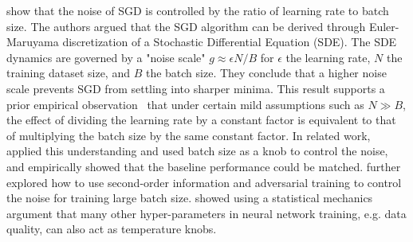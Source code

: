 \citep{jastrzkebski2017three,smith2018bayesian,devarakonda2017adabatch} show that the noise of SGD is controlled by the ratio of learning rate to batch size. The authors argued that
the SGD algorithm can be derived through Euler-Maruyama discretization of a Stochastic Differential Equation (SDE).
The SDE dynamics are  governed by a "noise scale" $g \approx \epsilon N/B$ for $\epsilon$ the learning rate, $N$ 
the training dataset size, and $B$ the batch size. They conclude that a higher noise scale 
prevents SGD from settling into sharper minima. This result supports a prior empirical 
observation~\citep{krizhevsky2014one} that under certain mild assumptions such as $N \gg B$,
the effect of dividing the learning rate by a constant factor is equivalent to that of 
multiplying the batch size by the same constant factor.
In related work, \citep{smith2017don} applied this understanding and used batch size
as a knob to control the noise, and empirically showed that the baseline performance could be matched. \cite{yao2018large} further explored how to use second-order information and adversarial training to control the noise for training large batch size.
\cite{martin2017rethinking,martin2018implicit} showed using a statistical mechanics argument that many other hyper-parameters in neural network training, e.g. data quality, can also act as temperature knobs.